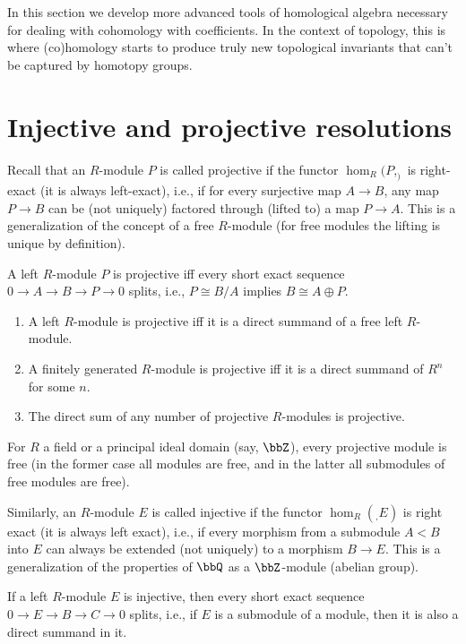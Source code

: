 In this section we develop more advanced tools of homological algebra necessary for dealing with cohomology with coefficients. In the context of topology, this is where (co)homology starts to produce truly new topological invariants that can't be captured by homotopy groups.

\section{Injective and projective resolutions}


Recall that an  $R$-module $P$ is called projective if the functor $\hom_R(P,_)$ is right-exact (it is always left-exact), i.e., if for every surjective map $A\to B$, any map $P\to B$ can be (not uniquely) factored through (lifted to) a map $P\to A$. This is a generalization of the concept of a free $R$-module (for free modules the lifting is unique by definition).

\begin{prop}
    A left $R$-module $P$ is projective iff every short exact sequence $0\to A\to B\to P\to 0$ splits, i.e., $P\cong B/A$ implies $B\cong A\oplus P$.
\end{prop}

\begin{thm}
    \begin{enumerate}
        \item A left $R$-module is projective iff it is a direct summand of a free left $R$-module.
        \item A finitely generated $R$-module  is projective iff it is a direct summand of $R^n$ for some $n$.
        \item The direct sum of any number of projective $R$-modules is projective.
    \end{enumerate}
\end{thm}

For $R$ a field or a principal ideal domain (say, $\bbZ$), every projective module is free (in the former case all modules are free, and in the latter all submodules of free modules are free).


Similarly, an $R$-module $E$ is called injective if the functor $\hom_R(_,E)$ is right exact (it is always left exact), i.e., if every morphism from a submodule $A<B$ into $E$ can always be extended (not uniquely) to a morphism $B\to E$. This is a generalization of the properties of $\bbQ$ as a $\bbZ$-module (abelian group).

\begin{prop}
    If a left $R$-module $E$ is injective, then every short exact sequence $0\to E\to B\to C\to 0$ splits, i.e., if $E$ is a submodule of a module, then it is also a direct summand in it.
\end{prop}

